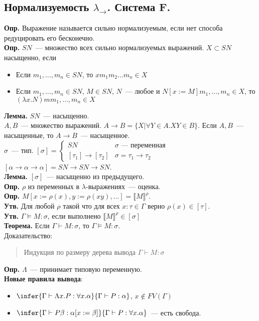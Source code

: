 \documentclass{article}
\begin{document}
	\subsection{Нормализуемость $\lambda_{\rightarrow}$. Система F.}
	\textbf{Опр.} Выражение называется сильно нормализуемым, если нет способа редуцировать его бесконечно. \\
	\textbf{Опр.} $SN$~--- множество всех сильно нормализуемых выражений. $X \subset SN$ насыщенно, если
	\begin{itemize}
		\item Если $m_1, \dots, m_n \in SN$, то $x m_1 m_2 \dots m_n \in X$
		\item Если $m_1, \dots, m_n \in SN$, $M \in SN$, $N$~--- любое и $N [x := M] m_1, \dots, m_n \in X$, то $(\lambda x. N) m m_1, \dots, m_n \in X$
	\end{itemize}
	\textbf{Лемма.} $SN$~--- насыщенно. \\
	$A, B$~--- множество выражений. $A \rightarrow B = \{ X | \forall Y \in A. XY \in B \}$. Если $A, B$~--- насыщенные, то $A \rightarrow B$~--- насыщенное. \\
	$\sigma$~--- тип. $[\sigma] = \begin{cases}
		SN & \sigma \text{~--- переменная} \\
		[\tau_1] \rightarrow [\tau_2] & \sigma = \tau_1 \rightarrow \tau_2
	\end{cases}$ \\
	$[\alpha \rightarrow \alpha \rightarrow \alpha] = SN \rightarrow SN \rightarrow SN$. \\
	\textbf{Лемма.} $[\sigma]$~--- насыщенно из предыдущего. \\
	\textbf{Опр.} $\rho$ из переменных в $\lambda$-выражениях~--- оценка. \\
	\textbf{Опр.} $M [x := \rho (x), y := \rho (xy), ...] = \llbracket M \rrbracket ^{\rho}$. \\
	\textbf{Утв.} Для любой $\rho$ такой что для всех $x : \tau \in \Gamma$ верно $\rho (x) \in [\tau]$. \\
	\textbf{Утв.} $\Gamma \vDash M : \sigma$, если выполнено $\llbracket M \rrbracket ^{\rho} \in [\sigma]$ \\
	\textbf{Теорема.} Если $\Gamma \vdash M : \sigma$, то $\Gamma \vDash M : \sigma$. \\
	Доказательство:
	\begin{quote}
		Индукция по размеру дерева вывода $\Gamma \vdash M : \sigma$
	\end{quote}
	\textbf{Опр.} $\Lambda$~--- принимает типовую переменную. \\
	\textbf{Новые правила вывода}:
	\begin{itemize}
		\item $\infer{\Gamma \vdash \Lambda x. P : \forall x. \alpha}{\Gamma \vdash P : \alpha}$, $x \not\in FV(\Gamma)$
		\item $\infer{\Gamma \vdash P \beta : \alpha [x := \beta]}{\Gamma \vdash P : \forall x. \alpha}$~--- есть свобода.
	\end{itemize}
\end{document}
